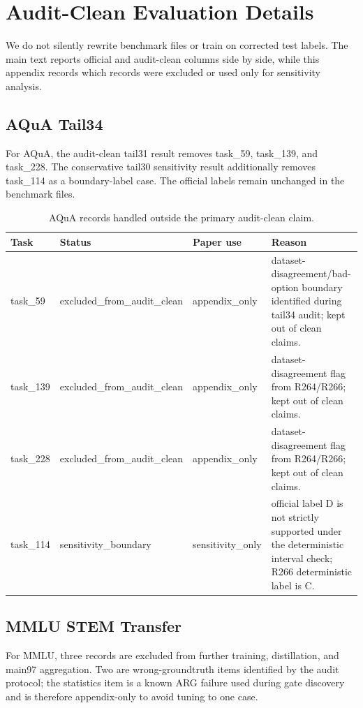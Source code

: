 \section{Audit-Clean Evaluation Details}
\label{app:label-audit}

We do not silently rewrite benchmark files or train on corrected test labels. The main text reports official and audit-clean columns side by side, while this appendix records which records were excluded or used only for sensitivity analysis.

\subsection{AQuA Tail34}

For AQuA, the audit-clean tail31 result removes task\_59, task\_139, and task\_228. The conservative tail30 sensitivity result additionally removes task\_114 as a boundary-label case. The official labels remain unchanged in the benchmark files.

\begin{table}[h]
\centering
\small
\begin{tabular}{llll}
\toprule
Task & Status & Paper use & Reason \\
\midrule
task\_59 & excluded\_from\_audit\_clean & appendix\_only & dataset-disagreement/bad-option boundary identified during tail34 audit; kept out of clean claims. \\
task\_139 & excluded\_from\_audit\_clean & appendix\_only & dataset-disagreement flag from R264/R266; kept out of clean claims. \\
task\_228 & excluded\_from\_audit\_clean & appendix\_only & dataset-disagreement flag from R264/R266; kept out of clean claims. \\
task\_114 & sensitivity\_boundary & sensitivity\_only & official label D is not strictly supported under the deterministic interval check; R266 deterministic label is C. \\
\bottomrule
\end{tabular}
\caption{AQuA records handled outside the primary audit-clean claim.}
\label{tab:aqua-label-audit}
\end{table}

\subsection{MMLU STEM Transfer}

For MMLU, three records are excluded from further training, distillation, and main97 aggregation. Two are wrong-groundtruth items identified by the audit protocol; the statistics item is a known ARG failure used during gate discovery and is therefore appendix-only to avoid tuning to one case.

